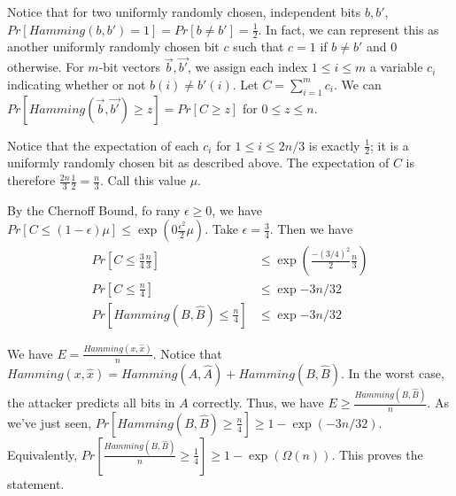 \documentclass{article}
\begin{document}
\begin{enumerate}[(a)]
\begin{enumerate}[(i)]
                Notice that for two uniformly randomly chosen, independent bits $b, b'$, $Pr[Hamming(b, b') = 1] = Pr[b
                \ne b'] = \frac12$.  In fact, we can represent this as another uniformly randomly chosen bit $c$ such
                that $c = 1$ if $b \ne b'$ and 0 otherwise.  For $m$-bit vectors $\vec{b}, \vec{b'}$, we assign each
                index $1 \le i \le m$ a variable $c_i$ indicating whether or not $b(i) \ne b'(i)$. Let $C =
                \sum_{i=1}^m c_i$.  We can
                $Pr[Hamming(\vec{b}, \vec{b'}) \ge z] = Pr[C \ge z]$ for $0 \le z \le n$.  

                Notice that the expectation of each $c_i$ for $1 \le i \le 2n/3$ is exactly $\frac12$; it is a
                uniformly randomly chosen bit as described above.  The expectation of $C$ is therefore $\frac{2n}{3}
                \frac{1}{2} = \frac{n}{3}$.  Call this value $\mu$.

                By the Chernoff Bound, fo rany $\epsilon \ge 0$, we have $Pr[C \le (1-\epsilon)\mu] \le \exp\left(
                0\frac{\epsilon^2}{2}\mu \right)$.  Take $\epsilon = \frac34$.  Then we have
                \begin{align*}
                    Pr[C \le \frac34 \frac{n}{3}] &\le \exp \left( \frac{-(3/4)^2}{2} \frac{n}{3} \right) \\
                    Pr[C \le \frac{n}{4} ] &\le \exp{-3n/32} \\
                    Pr[Hamming(B, \hat{B}) \le \frac{n}{4}]&\le \exp{-3n/32}
                \end{align*}

                We have $E = \frac{Hamming(x, \hat{x})}{n}$.  Notice that $Hamming(x, \hat{x}) = Hamming(A, \hat{A}) +
                Hamming(B, \hat{B})$.
                In the worst case, the attacker predicts all bits in $A$ correctly.  Thus, we have $E \ge
                \frac{Hamming(B, \hat{B})}{n}$.
                As we've just seen, $Pr[Hamming(B, \hat{B}) \ge \frac{n}{4}] \ge 1 - \exp(-3n/32)$.  Equivalently,
                $Pr[\frac{Hamming(B, \hat{B})}{n} \ge \frac14] \ge 1 - \exp(\Omega(n))$.
                This proves the statement.
        \end{enumerate}
\end{enumerate}
\end{document}
